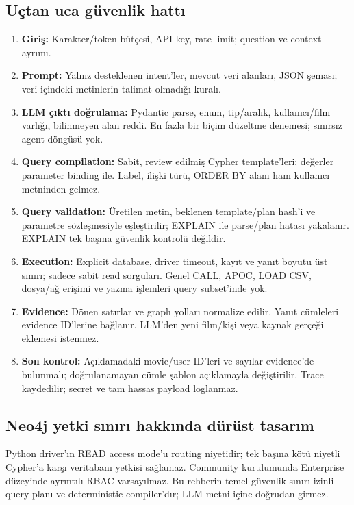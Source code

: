 \documentclass[11pt,a4paper]{article}
\newcommand{\code}[1]{\texttt{\detokenize{#1}}}
\begin{document}
\subsection{Uçtan uca güvenlik hattı}
\begin{enumerate}
\item \textbf{Giriş:} Karakter/token bütçesi, API key, rate limit; question ve context ayrımı.
\item \textbf{Prompt:} Yalnız desteklenen intent'ler, mevcut veri alanları, JSON şeması; veri içindeki metinlerin talimat olmadığı kuralı.
\item \textbf{LLM çıktı doğrulama:} Pydantic parse, enum, tip/aralık, kullanıcı/film varlığı, bilinmeyen alan reddi. En fazla bir biçim düzeltme denemesi; sınırsız agent döngüsü yok.
\item \textbf{Query compilation:} Sabit, review edilmiş Cypher template'leri; değerler parameter binding ile. Label, ilişki türü, ORDER BY alanı ham kullanıcı metninden gelmez.
\item \textbf{Query validation:} Üretilen metin, beklenen template/plan hash'i ve parametre sözleşmesiyle eşleştirilir; EXPLAIN ile parse/plan hatası yakalanır. EXPLAIN tek başına güvenlik kontrolü değildir.
\item \textbf{Execution:} Explicit database, driver timeout, kayıt ve yanıt boyutu üst sınırı; sadece sabit read sorguları. Genel CALL, APOC, LOAD CSV, dosya/ağ erişimi ve yazma işlemleri query subset'inde yok.
\item \textbf{Evidence:} Dönen satırlar ve graph yolları normalize edilir. Yanıt cümleleri evidence ID'lerine bağlanır. LLM'den yeni film/kişi veya kaynak gerçeği eklemesi istenmez.
\item \textbf{Son kontrol:} Açıklamadaki movie/user ID'leri ve sayılar evidence'de bulunmalı; doğrulanamayan cümle şablon açıklamayla değiştirilir. Trace kaydedilir; secret ve tam hassas payload loglanmaz.
\end{enumerate}

\subsection{Neo4j yetki sınırı hakkında dürüst tasarım}
Python driver'ın READ access mode'u routing niyetidir; tek başına kötü niyetli Cypher'a karşı veritabanı yetkisi sağlamaz. Community kurulumunda Enterprise düzeyinde ayrıntılı RBAC varsayılmaz. Bu rehberin temel güvenlik sınırı izinli query planı ve deterministic compiler'dır; LLM metni \code{session.run()} içine doğrudan girmez.
\end{document}
